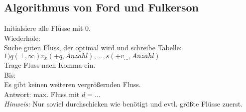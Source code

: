 \subsection*{Algorithmus von Ford und Fulkerson}
Initialsiere alle Flüsse mit 0.\\
Wiederhole:\\
	Suche guten Fluss, der optimal wird und schreibe Tabelle:\\
	$1) q(\bot,\infty) v_x(+q,Anzahl), ... , s(+v_{...},Anzahl)$\\
	Trage Fluss nach Komma ein.\\
Bis:\\
Es gibt keinen weiteren vergrößernden Fluss.\\
Antwort: max. Fluss mit $d=...$\\
\emph{Hinweis:} Nur soviel durchschicken wie benötigt und evtl. größte Flüsse zuerst.